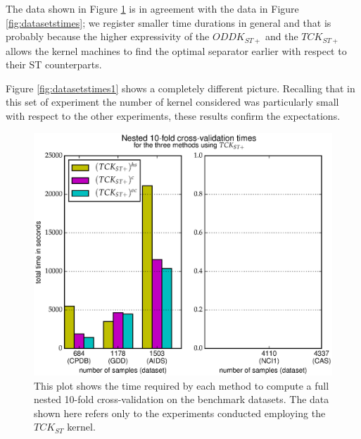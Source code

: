 The data shown in Figure \ref{fig:datasetstimes2} is in agreement with the data
in Figure \ref{fig:datasetstimes}; we register smaller time durations in general
and that is probably because the higher expressivity of the $ODDK_{ST+}$ and the
$TCK_{ST+}$ allows the kernel machines to find the optimal separator earlier with
respect to their ST counterparts.

Figure \ref{fig:datasetstimes1} shows a completely different picture.
Recalling that in this set of experiment the number of kernel considered was particularly
small with respect to the other experiments, these results confirm the expectations.

\begin{figure}[ht]
    \centering
    \includegraphics[scale=0.7]{Figures/total_times2}
    \caption{
        This plot shows the time required by each method to compute a full nested 10-fold cross-validation on the benchmark datasets.
        The data shown here refers only to the experiments conducted employing the $TCK_{ST}$ kernel.
    }
    \label{fig:datasetstimes2}
\end{figure}

